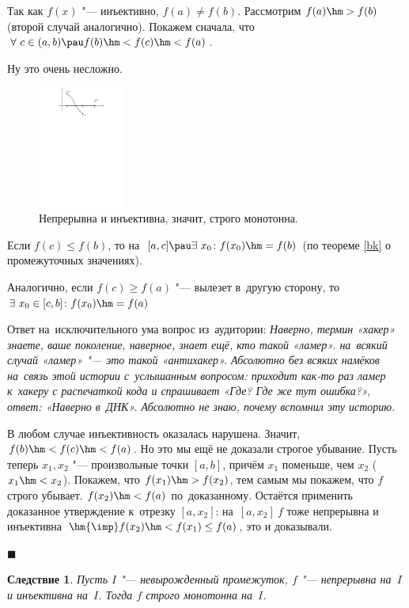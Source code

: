 \documentclass[a4paper,10pt,twoside]{article}
\newtheorem{Sl}{Следствие}[section]
\newenvironment{Proof}
       {\par\noindent{\textbf{Доказательство.}}}
       {\hfill$\scriptstyle\blacksquare$}
\begin{document}
\begin{Proof}
Так как $f(x)$ "--- инъективно, $f(a)\neq f(b)$. Рассмотрим $f(a)\hm>f(b)$ (второй случай аналогично). Покажем сначала, что
$\forall\  c\in(a,b)\pau f(b)\hm<f(c)\hm<f(a)$.

Ну это очень несложно.

\begin{figure}[htbp]\centering
    \includegraphics[height=4cm]{img/final/galat/Rasr/abc.pdf}\caption{Непрерывна и инъективна, значит, строго монотонна.}
\end{figure}

Если $f(c)\leq f(b)$, то на~$[a,c]\pau \exists\  x_0\colon
f(x_0)\hm=f(b)$ (по теореме \ref{bk} о промежуточных значениях).

Аналогично, если $f(c)\geq f(a)$ "--- вылезет в~другую сторону, то $\exists\  x_0\in [c,b]\colon f(x_0)\hm=f(a)$


Ответ на~исключительного ума вопрос из~аудитории: \textit{
Наверно, термин «хакер» знаете, ваше поколение, наверное, знает ещё, кто такой «ламер». на~всякий случай «ламер» "--- это такой «антихакер». Абсолютно без всяких намёков на~связь этой истории с~услышанным вопросом: приходит как-то раз ламер к~хакеру
с распечаткой кода и спрашивает «Где? Где же тут ошибка?», ответ: «Наверно в~ДНК». Абсолютно не знаю, почему вспомнил эту историю.}

В любом случае инъективность оказалась нарушена. Значит, $f(b)\hm<f(c)\hm<f(a)$. Но это мы ещё не доказали строгое убывание. Пусть теперь $x_1,x_2$ "--- произвольные точки $[a,b]$, причём $x_1$ поменьше, чем $x_2$ ($x_1\hm<x_2$). Покажем, что $f(x_1)\hm>f(x_2)$, тем самым мы покажем, что $f$ строго убывает. $f(x_2)\hm<f(a)$ по~доказанному. Остаётся применить доказанное утверждение к~отрезку $[a,x_2]$: на~$[a,x_2]\ f$ тоже непрерывна и инъективна $\hm{\imp} f(x_2)\hm<f(x_1)\leq f(a)$, это и доказывали.

\end{Proof}

\begin{Sl}
Пусть $I$ "--- невырожденный промежуток, $f$ "--- непрерывна на~$I$ и инъективна на~$I$. Тогда $f$ строго монотонна на~$I$.
\end{Sl}
\end{document}

